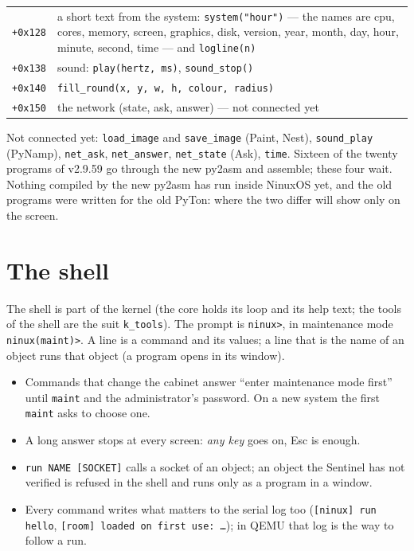 \documentclass[11pt,a4paper]{article}
\newcommand{\cmd}[1]{\texttt{#1}}
\begin{document}
\begin{longtable}{@{}l p{12cm}@{}}
\texttt{+0x128} & a short text from the system: \texttt{system("hour")} --- the names are cpu,
                 cores, memory, screen, graphics, disk, version, year, month, day, hour, minute,
                 second, time --- and \texttt{logline(n)} \\
\texttt{+0x138} & sound: \texttt{play(hertz, ms)}, \texttt{sound\_stop()} \\
\texttt{+0x140} & \texttt{fill\_round(x, y, w, h, colour, radius)} \\
\texttt{+0x150} & the network (state, ask, answer) --- not connected yet \\
\bottomrule
\end{longtable}

\noindent Not connected yet: \texttt{load\_image} and \texttt{save\_image} (Paint, Nest),
\texttt{sound\_play} (PyNamp), \texttt{net\_ask}, \texttt{net\_answer}, \texttt{net\_state} (Ask),
\texttt{time}. Sixteen of the twenty programs of v2.9.59 go through the new py2asm and assemble;
these four wait. Nothing compiled by the new py2asm has run inside NinuxOS yet, and the old
programs were written for the old PyTon: where the two differ will show only on the screen.

\section{The shell}\label{sec:shell}

The shell is part of the kernel (the core holds its loop and its help text; the tools of the
shell are the suit \texttt{k\_tools}). The prompt is \texttt{ninux>}, in maintenance mode
\texttt{ninux(maint)>}. A line is a command and its values; a line that is the name of an object
runs that object (a program opens in its window).

\begin{itemize}
\item Commands that change the cabinet answer ``enter maintenance mode first'' until \cmd{maint}
      and the administrator's password. On a new system the first \cmd{maint} asks to choose one.
\item A long answer stops at every screen: \emph{any key} goes on, Esc is enough.
\item \cmd{run NAME [SOCKET]} calls a socket of an object; an object the Sentinel has not verified
      is refused in the shell and runs only as a program in a window.
\item Every command writes what matters to the serial log too (\texttt{[ninux] run hello},
      \texttt{[room] loaded on first use: \ldots}); in QEMU that log is the way to follow a run.
\end{itemize}
\end{document}
